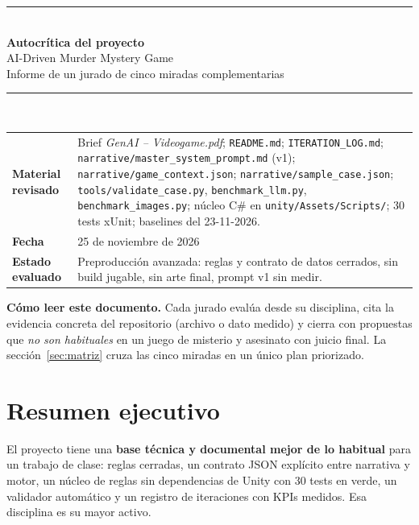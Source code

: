 \documentclass[11pt,a4paper]{article}
\newcommand{\file}[1]{\texttt{\small #1}}
\begin{document}
\begin{titlepage}
\centering
\vspace*{2.5cm}
{\color{neon}\rule{\linewidth}{2pt}}\\[0.6cm]
{\Huge\bfseries\color{ink} Autocrítica del proyecto\\[0.3cm]}
{\LARGE\color{ink} AI-Driven Murder Mystery Game\\[0.4cm]}
{\large Informe de un jurado de cinco miradas complementarias}\\[0.4cm]
{\color{neon}\rule{\linewidth}{2pt}}\\[1.5cm]

\begin{tabularx}{0.85\linewidth}{>{\bfseries}l X}
Material revisado & Brief \emph{GenAI -- Videogame.pdf}; \file{README.md}; \file{ITERATION\_LOG.md};
\file{narrative/master\_system\_prompt.md} (v1); \file{narrative/game\_context.json};
\file{narrative/sample\_case.json}; \file{tools/validate\_case.py}, \file{benchmark\_llm.py},
\file{benchmark\_images.py}; núcleo C\# en \file{unity/Assets/Scripts/}; 30 tests xUnit;
baselines del 23-11-2026. \\[4pt]
Fecha & 25 de noviembre de 2026 \\[4pt]
Estado evaluado & Preproducción avanzada: reglas y contrato de datos cerrados, sin build jugable,
sin arte final, prompt v1 sin medir. \\
\end{tabularx}

\vfill
\begin{perfil}
\textbf{Cómo leer este documento.} Cada jurado evalúa desde su disciplina, cita la evidencia
concreta del repositorio (archivo o dato medido) y cierra con propuestas que \emph{no son
habituales} en un juego de misterio y asesinato con juicio final. La sección~\ref{sec:matriz}
cruza las cinco miradas en un único plan priorizado.
\end{perfil}
\end{titlepage}

\tableofcontents
\newpage

\section{Resumen ejecutivo}

El proyecto tiene una \textbf{base técnica y documental mejor de lo habitual} para un trabajo de
clase: reglas cerradas, un contrato JSON explícito entre narrativa y motor, un núcleo de reglas sin
dependencias de Unity con 30 tests en verde, un validador automático y un registro de iteraciones con
KPIs medidos. Esa disciplina es su mayor activo.
\end{document}
